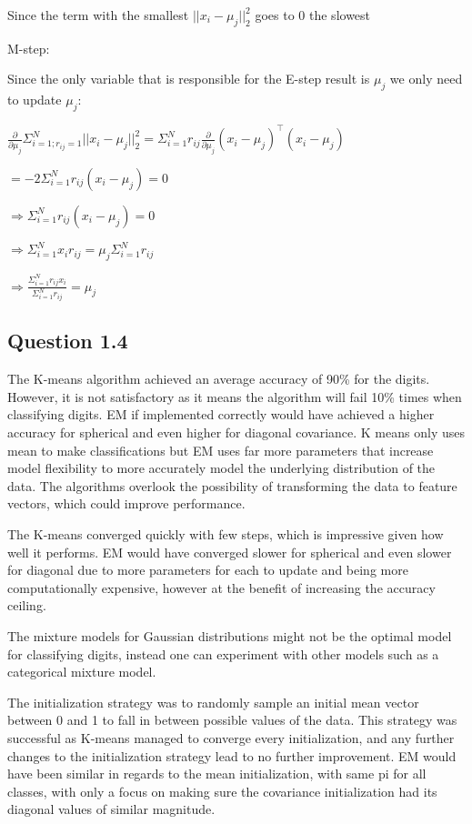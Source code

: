 \documentclass[
]{article}
\begin{document}
Since the term with the smallest \(||x_i-\mu_j||_2^2\) goes to \(0\) the
slowest

M-step:

Since the only variable that is responsible for the E-step result is
\(\mu_j\) we only need to update \(\mu_j\):

\(\frac{\partial}{\partial \mu_j}\Sigma_{i=1;r_{ij}=1}^N||x_i-\mu_j||_2^2 = \Sigma_{i=1}^Nr_{ij}\frac{\partial}{\partial \mu_j}(x_i-\mu_j)^\top(x_i-\mu_j)\)

\(=-2\Sigma_{i=1}^Nr_{ij}(x_i-\mu_j) = 0\)

\(\Rightarrow\Sigma_{i=1}^Nr_{ij}(x_i-\mu_j) = 0\)

\(\Rightarrow\Sigma_{i=1}^Nx_ir_{ij} = \mu_j\Sigma_{i=1}^Nr_{ij}\)

\(\Rightarrow\frac{\Sigma_{i=1}^Nr_{ij}x_i}{\Sigma_{i=1}^Nr_{ij}} = \mu_j\)

\hypertarget{question-1.4}{%
\subsection{Question 1.4}\label{question-1.4}}

The K-means algorithm achieved an average accuracy of 90\% for the
digits. However, it is not satisfactory as it means the algorithm will
fail 10\% times when classifying digits. EM if implemented correctly
would have achieved a higher accuracy for spherical and even higher for
diagonal covariance. K means only uses mean to make classifications but
EM uses far more parameters that increase model flexibility to more
accurately model the underlying distribution of the data. The algorithms
overlook the possibility of transforming the data to feature vectors,
which could improve performance.

The K-means converged quickly with few steps, which is impressive given
how well it performs. EM would have converged slower for spherical and
even slower for diagonal due to more parameters for each to update and
being more computationally expensive, however at the benefit of
increasing the accuracy ceiling.

The mixture models for Gaussian distributions might not be the optimal
model for classifying digits, instead one can experiment with other
models such as a categorical mixture model.

The initialization strategy was to randomly sample an initial mean
vector between 0 and 1 to fall in between possible values of the data.
This strategy was successful as K-means managed to converge every
initialization, and any further changes to the initialization strategy
lead to no further improvement. EM would have been similar in regards to
the mean initialization, with same pi for all classes, with only a focus
on making sure the covariance initialization had its diagonal values of
similar magnitude.
\end{document}
